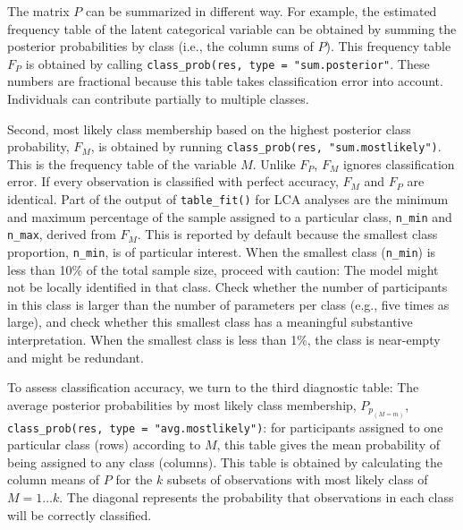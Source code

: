 \documentclass[
  ,man,floatsintext]{apa6}
\begin{document}
The matrix \(P\) can be summarized in different way.
For example, the estimated frequency table of the latent categorical variable can be obtained by summing the posterior probabilities by class (i.e., the column sums of \(P\)).
This frequency table \(F_P\) is obtained by calling \texttt{class\_prob(res,\ type\ =\ "sum.posterior"}.
These numbers are fractional because this table takes classification error into account.
Individuals can contribute partially to multiple classes.

Second, most likely class membership based on the highest posterior class probability, \(F_M\), is obtained by running \texttt{class\_prob(res,\ "sum.mostlikely")}.
This is the frequency table of the variable \(M\).
Unlike \(F_P\), \(F_M\) ignores classification error.
If every observation is classified with perfect accuracy,
\(F_M\) and \(F_P\) are identical.
Part of the output of \texttt{table\_fit()} for LCA analyses
are the minimum and maximum percentage of the sample assigned to a particular class, \texttt{n\_min} and \texttt{n\_max}, derived from \(F_M\).
This is reported by default because the smallest class proportion, \texttt{n\_min}, is of particular interest.
When the smallest class (\texttt{n\_min}) is less than 10\% of the total sample size,
proceed with caution:
The model might not be locally identified in that class.
Check whether the number of participants in this class is larger than the number of parameters per class (e.g., five times as large),
and check whether this smallest class has a meaningful substantive interpretation.
When the smallest class is less than 1\%, the class is near-empty and might be redundant.

To assess classification accuracy, we turn to the third diagnostic table:
The average posterior probabilities by most likely class membership, \(P_{p_{(M = m)}}\), \texttt{class\_prob(res,\ type\ =\ "avg.mostlikely")}:
for participants assigned to one particular class (rows) according to \(M\),
this table gives the mean probability of being assigned to any class (columns).
This table is obtained by calculating the column means of \(P\) for the
\(k\) subsets of observations with most likely class of \(M = 1 \ldots k\).
The diagonal represents the probability that observations in each class will be correctly classified.
\end{document}
